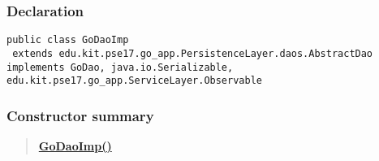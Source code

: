 \documentclass[11pt,a4paper]{report}
\begin{document}
{{{{{{{{{{\subsubsection{Declaration}{
\begin{lstlisting}[frame=none]
public class GoDaoImp
 extends edu.kit.pse17.go_app.PersistenceLayer.daos.AbstractDao implements GoDao, java.io.Serializable, edu.kit.pse17.go_app.ServiceLayer.Observable\end{lstlisting}
\subsubsection{Constructor summary}{
\begin{verse}
\hyperlink{edu.kit.pse17.go_app.PersistenceLayer.daos.GoDaoImp()}{{\bf GoDaoImp()}} \\
\end{verse}
}
}}}}}}}}}}}
\end{document}
